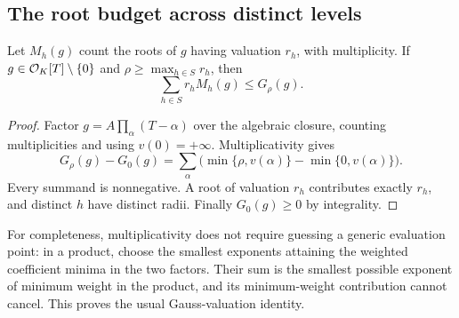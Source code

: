\subsection{The root budget across distinct levels}
\begin{lemma}
\label{lem:root-budget}
Let $M_h(g)$ count the roots of $g$ having valuation $r_h$, with multiplicity. If $g\in\mathcal O_K[T]\setminus\{0\}$ and $\rho\ge\max_{h\in S}r_h$, then
\[
\sum_{h\in S}r_hM_h(g)\le G_\rho(g).
\]
\end{lemma}
\begin{proof}
Factor $g=A\prod_\alpha(T-\alpha)$ over the algebraic closure, counting multiplicities and using $v(0)=+\infty$. Multiplicativity gives
\[
 G_\rho(g)-G_0(g)
 =\sum_\alpha\bigl(\min\{\rho,v(\alpha)\}-\min\{0,v(\alpha)\}\bigr).
\]
Every summand is nonnegative. A root of valuation $r_h$ contributes exactly $r_h$, and distinct $h$ have distinct radii. Finally $G_0(g)\ge0$ by integrality.
\end{proof}

For completeness, multiplicativity does not require guessing a generic evaluation point: in a product, choose the smallest exponents attaining the weighted coefficient minima in the two factors. Their sum is the smallest possible exponent of minimum weight in the product, and its minimum-weight contribution cannot cancel. This proves the usual Gauss-valuation identity.

